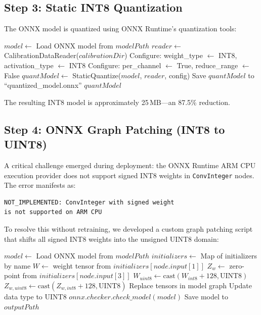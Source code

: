 \subsection{Step 3: Static INT8 Quantization}
The ONNX model is quantized using ONNX Runtime's quantization tools:

\begin{algorithm}[H]
\caption{Static INT8 Quantization}
\begin{algorithmic}[1]
    \State $model \gets$ Load ONNX model from $modelPath$
    \State $reader \gets$ CalibrationDataReader($calibrationDir$)
    \State Configure: weight\_type $\gets$ INT8, activation\_type $\gets$ INT8
    \State Configure: per\_channel $\gets$ True, reduce\_range $\gets$ False
    \State $quantModel \gets$ StaticQuantize($model$, $reader$, config)
    \State Save $quantModel$ to ``quantized\_model.onnx''
    \State \Return $quantModel$
\EndFunction
\end{algorithmic}
\end{algorithm}

The resulting INT8 model is approximately 25\,MB---an 87.5\% reduction.

\subsection{Step 4: ONNX Graph Patching (INT8 to UINT8)}
A critical challenge emerged during deployment: the ONNX Runtime ARM CPU execution provider does not support signed INT8 weights in \texttt{ConvInteger} nodes. The error manifests as:
\begin{verbatim}
NOT_IMPLEMENTED: ConvInteger with signed weight 
is not supported on ARM CPU
\end{verbatim}

To resolve this without retraining, we developed a custom graph patching script that shifts all signed INT8 weights into the unsigned UINT8 domain:

\begin{algorithm}[H]
\caption{Fix INT8 to UINT8 Weights}
\begin{algorithmic}[1]
    \State $model \gets$ Load ONNX model from $modelPath$
    \State $initializers \gets$ Map of initializers by name
            \State $W \gets$ weight tensor from $initializers[node.input[1]]$
            \State $Z_w \gets$ zero-point from $initializers[node.input[3]]$
                \State $W_{uint8} \gets \text{cast}(W_{int8} + 128, \text{UINT8})$
                \State $Z_{w,uint8} \gets \text{cast}(Z_{w,int8} + 128, \text{UINT8})$
                \State Replace tensors in model graph
                \State Update data type to UINT8
            \EndIf
        \EndIf
    \EndFor
    \State $onnx.checker.check\_model(model)$
    \State Save model to $outputPath$
\EndFunction
\end{algorithmic}
\end{algorithm}

